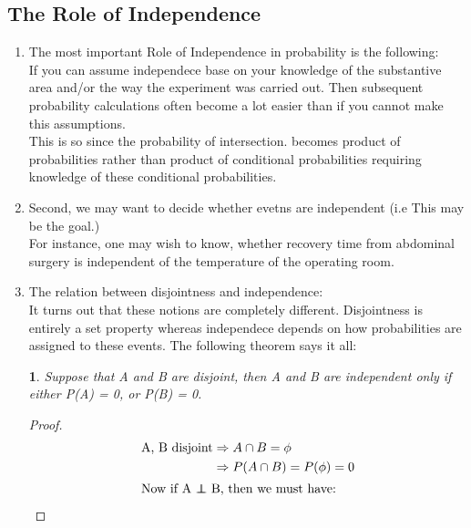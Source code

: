 \documentclass[11pt]{article}
\newtheorem{theorem}{\framebox{Thm}}[section]
\newcommand\independent{\protect\mathpalette{\protect\independenT}{\perp}}
\def\independenT#1#2{\mathrel{\rlap{$#1#2$}\mkern2mu{#1#2}}}
\begin{document}
        \subsection{The Role of Independence}
            \begin{enumerate}
                \item The most important Role of Independence in probability is the following:\\
                        If you can assume independece base on your knowledge of the substantive area 
                        and/or the way the experiment was carried out.
                        Then subsequent probability calculations often become a lot easier than if you cannot make this assumptions.\\
                        This is so since the probability of intersection. becomes product of probabilities 
                        rather than product of conditional probabilities requiring knowledge of these conditional probabilities.
                \item Second, we may want to decide whether evetns are independent (i.e This may be the goal.)\\
                        For instance, one may wish to know, whether recovery time from abdominal surgery is independent of the temperature of the operating room.
                \item The relation between disjointness and independence: \\
                        It turns out that these notions are completely different.
                        Disjointness is entirely a set property whereas independece depends on how probabilities are assigned to these events.
                        The following theorem says it all:
                        \begin{theorem}
                            Suppose that A and B are disjoint, then A and B are independent only if either P(A) = 0, or P(B) = 0.
                        \end{theorem}
                        \begin{proof}
                            \begin{align*}
                                \text{A, B disjoint}    &\Rightarrow A \cap B = \phi\\
                                                        &\Rightarrow P(A \cap B) = P(\phi) = 0\\
                                \intertext{Now if A $\independent$ B, then we must have: }

\end{align*}
\end{proof}
\end{enumerate}
\end{document}
